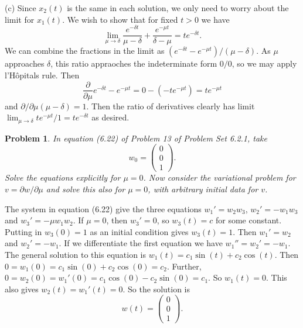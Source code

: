 \documentclass{article}
\newtheorem{problem}{Problem}
\begin{document}
(c) Since $x_2(t)$ is the same in each solution, we only need to worry about the limit for $x_1(t)$. We wish to show that for fixed $t > 0$ we have
\[
\lim_{\mu \rightarrow \delta} \frac{e^{-\delta t}}{\mu - \delta} + \frac{e^{-\mu t}}{\delta - \mu} = te^{-\delta t}.
\]
We can combine the fractions in the limit as $(e^{-\delta t} - e^{-\mu t})/(\mu - \delta)$. As $\mu$ approaches $\delta$, this ratio appraoches the indeterminate form $0/0$, so we may apply l'H\^{o}pitals rule. Then
\[
\frac{\partial}{\partial \mu} e^{-\delta t} - e^{-\mu t} = 0 - (-te^{-\mu t}) = te^{-\mu t}
\]
and $\partial/\partial \mu (\mu - \delta) = 1$. Then the ratio of derivatives clearly has limit $\lim_{\mu \rightarrow \delta} te^{-\mu t}/1 = te^{-\delta t}$ as desired.

\begin{problem}
In equation (6.22) of Problem 13 of Problem Set 6.2.1, take
\[
w_0 =
\left (
\begin{array}{c}
0\\
0\\
1
\end{array}
\right ).
\]
Solve the equations explicitly for $\mu = 0$. Now consider the variational problem for $v = \partial w/\partial \mu$ and solve this also for $\mu = 0$, with arbitrary initial data for $v$.
\end{problem}

The system in equation (6.22) give the three equations $w_1' = w_2w_3$, $w_2' = -w_1w_3$ and $w_3' = -\mu w_1w_2$. If $\mu = 0$, then $w_3' = 0$, so $w_3(t) = c$ for some constant. Putting in $w_3(0) = 1$ as an initial condition gives $w_3(t) = 1$. Then $w_1' = w_2$ and $w_2' = -w_1$. If we differentiate the first equation we have $w_1'' = w_2' = -w_1$. The general solution to this equation is $w_1(t) = c_1 \sin(t) + c_2 \cos(t)$. Then $0 = w_1(0) = c_1 \sin(0) + c_2 \cos(0) = c_2$. Further, $0 = w_2(0) = w_1'(0) = c_1 \cos(0) - c_2 \sin(0) = c_1$. So $w_1(t) = 0$. This also gives $w_2(t) = w_1'(t) = 0$. So the solution is
\[
w(t) = \left (
\begin{array}{c}
0\\
0\\
1
\end{array}
\right ).
\]
\end{document}
